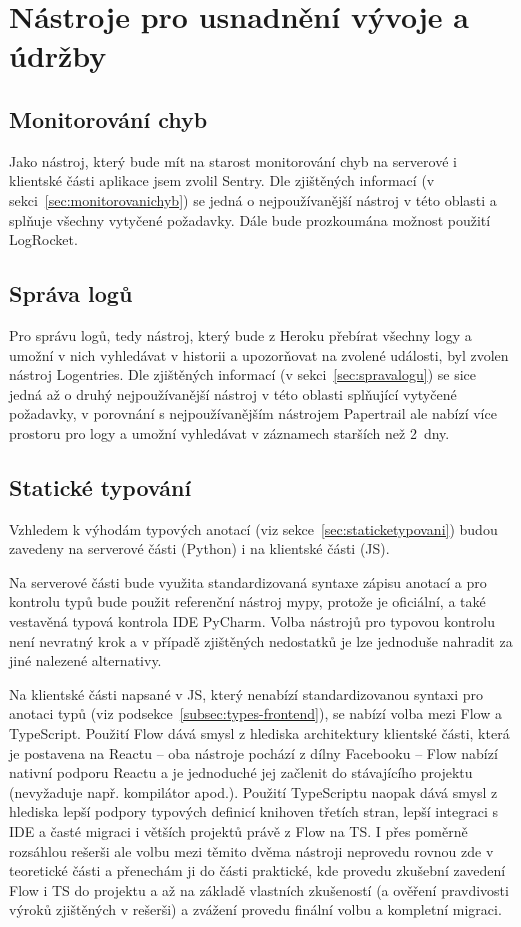 \section{Nástroje pro usnadnění vývoje a údržby}

\subsection{Monitorování chyb}

Jako nástroj, který bude mít na starost monitorování chyb na serverové i klientské části aplikace jsem zvolil Sentry. Dle zjištěných informací (v sekci~\ref{sec:monitorovanichyb}) se jedná o nejpoužívanější nástroj v této oblasti a splňuje všechny vytyčené požadavky. Dále bude prozkoumána možnost použití LogRocket.

\subsection{Správa logů}

Pro správu logů, tedy nástroj, který bude z Heroku přebírat všechny logy a umožní v nich vyhledávat v historii a upozorňovat na zvolené události, byl zvolen nástroj Logentries. Dle zjištěných informací (v sekci~\ref{sec:spravalogu}) se sice jedná až o druhý nejpoužívanější nástroj v této oblasti splňující vytyčené požadavky, v porovnání s nejpoužívanějším nástrojem Papertrail ale nabízí více prostoru pro logy a umožní vyhledávat v záznamech starších než 2~dny.

\subsection{Statické typování}

Vzhledem k výhodám typových anotací (viz sekce~\ref{sec:staticketypovani}) budou zavedeny na serverové části (Python) i na klientské části (JS).

Na serverové části bude využita standardizovaná syntaxe zápisu anotací a pro kontrolu typů bude použit referenční nástroj mypy, protože je oficiální, a také vestavěná typová kontrola IDE PyCharm. Volba nástrojů pro typovou kontrolu není nevratný krok a v případě zjištěných nedostatků je lze jednoduše nahradit za jiné nalezené alternativy.

Na klientské části napsané v JS, který nenabízí standardizovanou syntaxi pro anotaci typů (viz podsekce~\ref{subsec:types-frontend}), se nabízí volba mezi Flow a TypeScript. Použití Flow dává smysl z hlediska architektury klientské části, která je postavena na Reactu -- oba nástroje pochází z dílny Facebooku -- Flow nabízí nativní podporu Reactu a je jednoduché jej začlenit do stávajícího projektu (nevyžaduje např. kompilátor apod.). Použití TypeScriptu naopak dává smysl z hlediska lepší podpory typových definicí knihoven třetích stran, lepší integraci s IDE a časté migraci i větších projektů právě z Flow na TS. I přes poměrně rozsáhlou rešerši ale volbu mezi těmito dvěma nástroji neprovedu rovnou zde v teoretické části a přenechám ji do části praktické, kde provedu zkušební zavedení Flow i TS do projektu a až na základě vlastních zkušeností (a ověření pravdivosti výroků zjištěných v rešerši) a zvážení provedu finální volbu a kompletní migraci.

